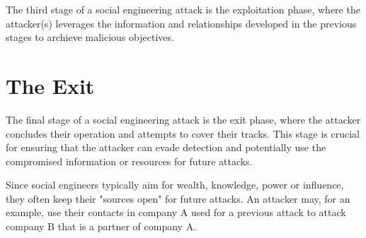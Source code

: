 The third stage of a social engineering attack is the exploitation phase, where the attacker(s) leverages the information and relationships developed in the previous stages to archieve malicious objectives.










\section{The Exit}
\begin{comment}
    
    - Not burning any bridges
    - Using the built relationships for future SE attacks
    - "Always leave them better off for having met you" also serves the purpose of using built relationships in the future again

\end{comment}

The final stage of a social engineering attack is the exit phase, where the attacker concludes their operation and attempts to cover their tracks. This stage is crucial for ensuring that the attacker can evade detection and potentially use the compromised information or resources for future attacks.

Since social engineers typically aim for wealth, knowledge, power or influence, they often keep their "sources open" for future attacks. An attacker may, for an example, use their contacts in company A used for a previous attack to attack company B that is a partner of company A.




